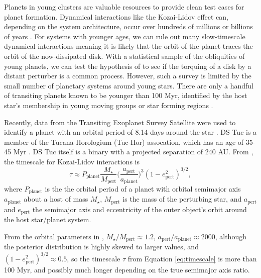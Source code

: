 \documentclass[twocolumn]{aastex63}
\newcommand{\tess}{{\it TESS}}
\begin{document}
Planets in young clusters are valuable resources to provide clean test cases for planet formation. 
Dynamical interactions like the Kozai-Lidov effect can, depending on the system architecture, occur over hundreds of millions or billions of years \citep{Montet15c, Naoz16}. 
For systems with younger ages, we can rule out many slow-timescale dynamical interactions meaning it is likely that the orbit of the planet traces the orbit of the now-dissipated disk. 
With a statistical sample of the obliquities of young planets, we can test the hypothesis of \citet{Batygin12} to see if the torquing of a disk by a distant perturber is a common process. However, such a survey is limited by the small number of planetary systems around young stars. There are only a handful of transiting planets known to be younger than 100 Myr, identified by the host star's membership in young moving groups or star forming regions \citep{David16, Mann16, David19}.

Recently, data from the Transiting Exoplanet Survey Satellite \citep[\tess, ][]{Ricker14} were used to identify a planet with an orbital period of 8.14 days around the star  \citep{Benatti19, Newton19}. 
DS Tuc is a member of the Tucana-Horologium (Tuc-Hor) assocation, which has an age of 35-45 Myr \citep{Bell15, Crundall19}. 
DS Tuc itself is a binary with a projected separation of 240 AU. 
From \citet{Holman97}, the timescale for Kozai-Lidov interactions is
\begin{equation}
    \tau \approx P_\textrm{planet} \frac{M_\star}{M_\textrm{pert}} \bigg(\frac{a_\textrm{pert}}{a_\textrm{planet}}\bigg)^3 (1-e^2_\textrm{pert})^{3/2},
\label{eq:timescale}
\end{equation}
where $P_\textrm{planet}$ is the the orbital period of a planet with orbital semimajor axis  $a_\textrm{planet}$ about a host of mass $M_\star$, $M_\textrm{pert}$ is the
mass of the perturbing star, and $a_\textrm{pert}$ and $e_\textrm{pert}$ the semimajor axis and eccentricity of the outer object's orbit around the host star/planet system.

From the orbital parameters in \citet{Newton19}, ${M_\star}/{M_\textrm{pert}} \approx 1.2$, ${a_\textrm{pert}}/{a_\textrm{planet}} \approx 2000$, although the posterior distribution is highly skewed to larger values, and $(1-e^2_\textrm{pert})^{3/2} \approx 0.5$, so the timescale $\tau$ from Equation \ref{eq:timescale} is more than 100 Myr, and possibly much longer depending on the true semimajor axis ratio. 
\end{document}

